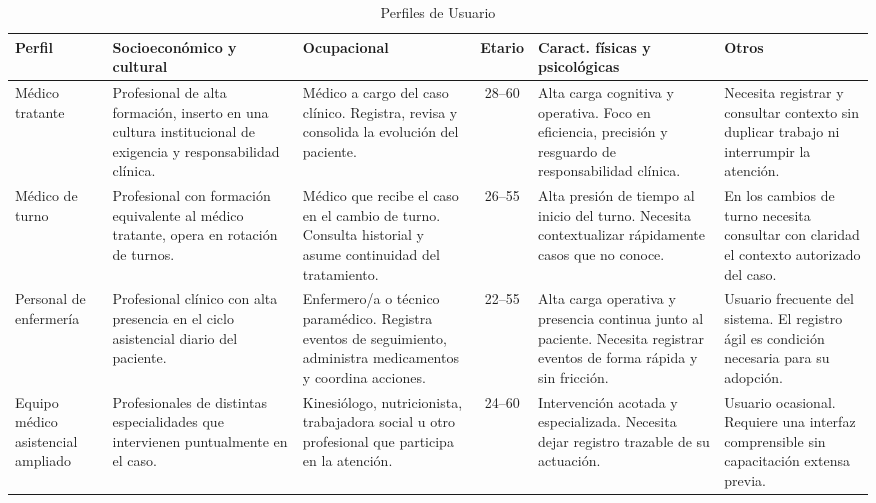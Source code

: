 \begin{table}[H]
    \caption{Perfiles de Usuario}
    \label{tab:perfiles_usuario}
    \begin{tabularx}{\textwidth}{|l|X|X|c|X|X|}
    \hline
    \textbf{Perfil} & \textbf{Socioeconómico y cultural} & \textbf{Ocupacional} & \textbf{Etario} & \textbf{Caract. físicas y psicológicas} & \textbf{Otros} \\
    \hline

    Médico tratante
    & Profesional de alta formación, inserto en una cultura institucional de exigencia y responsabilidad clínica.
    & Médico a cargo del caso clínico. Registra, revisa y consolida la evolución del paciente.
    & 28--60
    & Alta carga cognitiva y operativa. Foco en eficiencia, precisión y resguardo de responsabilidad clínica.
    & Necesita registrar y consultar contexto sin duplicar trabajo ni interrumpir la atención. \\
    \hline

    Médico de turno
    & Profesional con formación equivalente al médico tratante, opera en rotación de turnos.
    & Médico que recibe el caso en el cambio de turno. Consulta historial y asume continuidad del tratamiento.
    & 26--55
    & Alta presión de tiempo al inicio del turno. Necesita contextualizar rápidamente casos que no conoce.
    & En los cambios de turno necesita consultar con claridad el contexto autorizado del caso. \\
    \hline

    Personal de enfermería
    & Profesional clínico con alta presencia en el ciclo asistencial diario del paciente.
    & Enfermero/a o técnico paramédico. Registra eventos de seguimiento, administra medicamentos y coordina acciones.
    & 22--55
    & Alta carga operativa y presencia continua junto al paciente. Necesita registrar eventos de forma rápida y sin fricción.
    & Usuario frecuente del sistema. El registro ágil es condición necesaria para su adopción. \\
    \hline

    Equipo médico asistencial ampliado
    & Profesionales de distintas especialidades que intervienen puntualmente en el caso.
    & Kinesiólogo, nutricionista, trabajadora social u otro profesional que participa en la atención.
    & 24--60
    & Intervención acotada y especializada. Necesita dejar registro trazable de su actuación.
    & Usuario ocasional. Requiere una interfaz comprensible sin capacitación extensa previa. \\
    \hline

    \end{tabularx}
\end{table}


